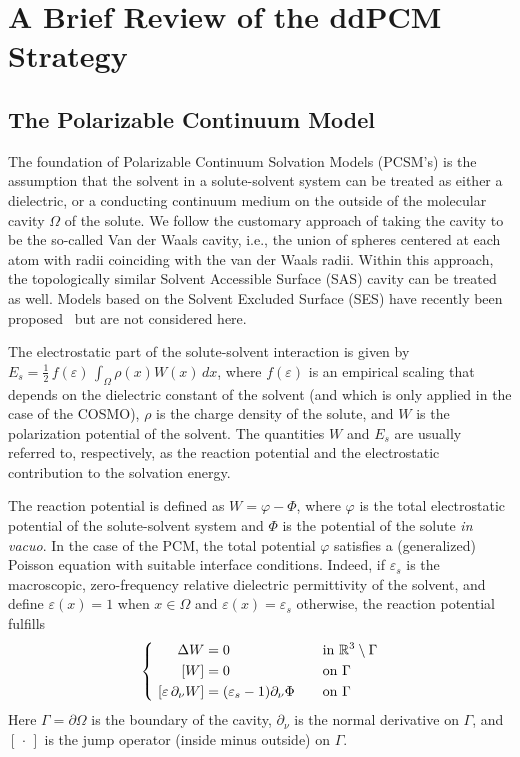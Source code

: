 \section{A Brief Review of the ddPCM Strategy}\label{sec:review}

\subsection{The Polarizable Continuum Model}
The foundation of Polarizable Continuum Solvation Models (PCSM's) is the assumption that the solvent in a solute-solvent system can be treated as either a dielectric, or a conducting continuum medium on the outside of the molecular cavity $\Omega$ of the solute. We follow the customary approach of taking the cavity to be the so-called Van der Waals cavity\cite{ReviewPCM_2005}, i.e., the union of spheres centered at each atom with radii coinciding with the van der Waals radii.
Within this approach, the topologically similar Solvent Accessible Surface (SAS) cavity can be treated as well. 
Models based on the Solvent Excluded Surface (SES) have recently been proposed~\cite{Harbrecht2011,quan2017polarizable,C5CP03410H,JCC:JCC21431} but are not considered here.

The electrostatic part of the solute-solvent interaction is given by $E_s = \tfrac{1}{2}\, f(\varepsilon)\,\int_\Omega \rho(x) W(x) \, dx$, where $f(\varepsilon)$ is an empirical scaling that depends on the dielectric constant of the solvent (and which is only applied in the case of the COSMO), $\rho$ is the charge density of the solute, and $W$ is the polarization potential of the solvent. The quantities $W$ and $E_s$ are usually referred to, respectively, as the reaction potential and the electrostatic contribution to the solvation energy. 

The reaction potential is defined as $W = \varphi - \Phi$, where $\varphi$ is the total electrostatic potential of the solute-solvent system and $\Phi$ is the potential of the solute \emph{in vacuo}. In the case of the PCM, the total potential $\varphi$ satisfies a (generalized) Poisson equation with suitable interface conditions\cite{Mennucci_JCP_IEF1,Mennucci_JMC_IEF2}. Indeed, if $\varepsilon_s$ is the macroscopic, zero-frequency relative dielectric permittivity of the solvent, and define $\varepsilon(x) = 1$ when $x \in \Omega$ and $\varepsilon(x) = \varepsilon_s$ otherwise, the reaction potential fulfills 
\begin{equation} 
\label{eq:pcmpde}
\left \{ 
\begin{alignedat}{4}
\Delta  W &= 0  &&\mbox{in } \mathbb{R}^3\setminus \Gamma  \\
 \ [W] &= 0  &&\mbox{on } \Gamma\\
\  [\varepsilon \, \partial_\nu W] &= (\varepsilon_s-1) \partial_\nu \Phi &\qquad& \mbox{on } \Gamma
\end{alignedat} 
\right.
\end{equation}
Here $\Gamma=\partial\Omega$ is the boundary of the cavity, $\partial_\nu$ is the normal derivative on $\Gamma$, and $[\,\cdot\,]$ is the jump operator (inside minus outside) on $\Gamma$.


